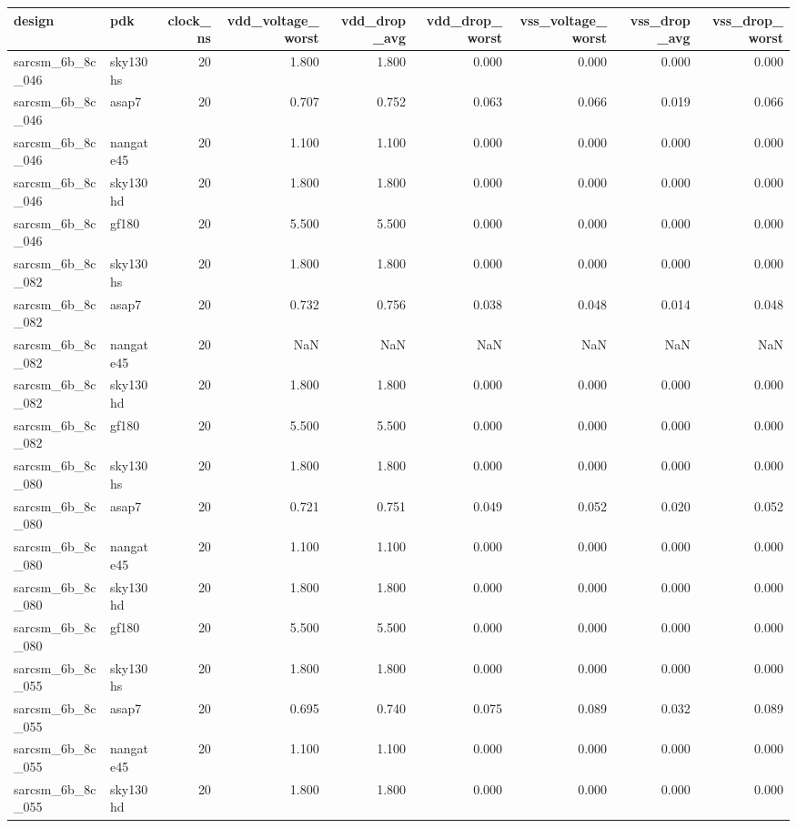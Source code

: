 \begin{tabular}{llrrrrrrr}
\toprule
design & pdk & clock\_ns & vdd\_voltage\_worst & vdd\_drop\_avg & vdd\_drop\_worst & vss\_voltage\_worst & vss\_drop\_avg & vss\_drop\_worst \\
\midrule
sarcsm\_6b\_8c\_046 & sky130hs & 20 & 1.800 & 1.800 & 0.000 & 0.000 & 0.000 & 0.000 \\
sarcsm\_6b\_8c\_046 & asap7 & 20 & 0.707 & 0.752 & 0.063 & 0.066 & 0.019 & 0.066 \\
sarcsm\_6b\_8c\_046 & nangate45 & 20 & 1.100 & 1.100 & 0.000 & 0.000 & 0.000 & 0.000 \\
sarcsm\_6b\_8c\_046 & sky130hd & 20 & 1.800 & 1.800 & 0.000 & 0.000 & 0.000 & 0.000 \\
sarcsm\_6b\_8c\_046 & gf180 & 20 & 5.500 & 5.500 & 0.000 & 0.000 & 0.000 & 0.000 \\
sarcsm\_6b\_8c\_082 & sky130hs & 20 & 1.800 & 1.800 & 0.000 & 0.000 & 0.000 & 0.000 \\
sarcsm\_6b\_8c\_082 & asap7 & 20 & 0.732 & 0.756 & 0.038 & 0.048 & 0.014 & 0.048 \\
sarcsm\_6b\_8c\_082 & nangate45 & 20 & NaN & NaN & NaN & NaN & NaN & NaN \\
sarcsm\_6b\_8c\_082 & sky130hd & 20 & 1.800 & 1.800 & 0.000 & 0.000 & 0.000 & 0.000 \\
sarcsm\_6b\_8c\_082 & gf180 & 20 & 5.500 & 5.500 & 0.000 & 0.000 & 0.000 & 0.000 \\
sarcsm\_6b\_8c\_080 & sky130hs & 20 & 1.800 & 1.800 & 0.000 & 0.000 & 0.000 & 0.000 \\
sarcsm\_6b\_8c\_080 & asap7 & 20 & 0.721 & 0.751 & 0.049 & 0.052 & 0.020 & 0.052 \\
sarcsm\_6b\_8c\_080 & nangate45 & 20 & 1.100 & 1.100 & 0.000 & 0.000 & 0.000 & 0.000 \\
sarcsm\_6b\_8c\_080 & sky130hd & 20 & 1.800 & 1.800 & 0.000 & 0.000 & 0.000 & 0.000 \\
sarcsm\_6b\_8c\_080 & gf180 & 20 & 5.500 & 5.500 & 0.000 & 0.000 & 0.000 & 0.000 \\
sarcsm\_6b\_8c\_055 & sky130hs & 20 & 1.800 & 1.800 & 0.000 & 0.000 & 0.000 & 0.000 \\
sarcsm\_6b\_8c\_055 & asap7 & 20 & 0.695 & 0.740 & 0.075 & 0.089 & 0.032 & 0.089 \\
sarcsm\_6b\_8c\_055 & nangate45 & 20 & 1.100 & 1.100 & 0.000 & 0.000 & 0.000 & 0.000 \\
sarcsm\_6b\_8c\_055 & sky130hd & 20 & 1.800 & 1.800 & 0.000 & 0.000 & 0.000 & 0.000 \\

\end{tabular}
